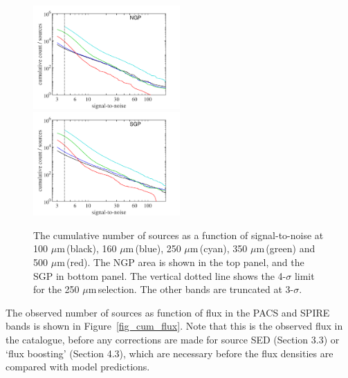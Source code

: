 \documentclass[useAMS,usenatbib]{mnras}
\def\mic{ $\mu $m\,}
\begin{document}
\begin{figure}
  \includegraphics[width=0.5\textwidth]{cum_sn_NGP.pdf}
\includegraphics[width=0.5\textwidth]{cum_sn_SGP.pdf}
 \caption{\protect\label{fig_sn} The cumulative number of sources as a function
   of signal-to-noise at 100\mic (black), 160\mic (blue), 250\mic (cyan),
  350\mic (green) and 500\mic (red). The NGP area is shown in the top panel,
  and the SGP in bottom panel. The vertical dotted line shows the
  4-$\sigma$ limit for the 250\mic selection. The other bands are
  truncated at 3-$\sigma$.  
} 
\end{figure}


The observed number of sources as function of flux in the PACS and
SPIRE bands is shown in Figure~\ref{fig_cum_flux}.  Note that this is
the observed flux in the catalogue, before any corrections are made
for source SED (Section 3.3) or `flux boosting' (Section 4.3), which
are necessary before the flux densities are compared with model
predictions. 
\end{document}
